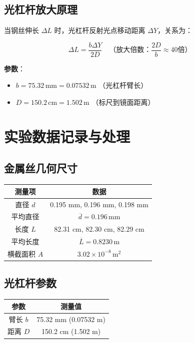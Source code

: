 \documentclass[12pt,a4paper]{article}
\begin{document}
\subsection{光杠杆放大原理}

当钢丝伸长 $\Delta L$ 时，光杠杆反射光点移动距离 $\Delta Y$，关系为：

\begin{equation}
\Delta L = \frac{b \Delta Y}{2D} \quad \text{（放大倍数：} \frac{2D}{b} \approx 40 \text{倍）}
\end{equation}

\textbf{参数}：
\begin{itemize}
\item $b = 75.32 \, \text{mm} = 0.07532 \, \text{m}$ （光杠杆臂长）
\item $D = 150.2 \, \text{cm} = 1.502 \, \text{m}$ （标尺到镜面距离）
\end{itemize}

\section{实验数据记录与处理}

\subsection{金属丝几何尺寸}

\begin{table}[H]
\centering
\begin{tabular}{|c|c|}
\hline
测量项 & 数据 \\
\hline
直径 $d$ & 0.195 mm, 0.196 mm, 0.198 mm \\
\hline
平均直径 & $\overline{d} = 0.196 \, \text{mm}$ \\
\hline
长度 $L$ & 82.31 cm, 82.30 cm, 82.29 cm \\
\hline
平均长度 & $\overline{L} = 0.8230 \, \text{m}$ \\
\hline
横截面积 $A$ & $3.02 \times 10^{-8} \, \text{m}^2$ \\
\hline
\end{tabular}
\end{table}

\subsection{光杠杆参数}

\begin{table}[H]
\centering
\begin{tabular}{|c|c|}
\hline
参数 & 测量值 \\
\hline
臂长 $b$ & 75.32 mm (0.07532 m) \\
\hline
距离 $D$ & 150.2 cm (1.502 m) \\
\hline
\end{tabular}
\end{table}
\end{document}
